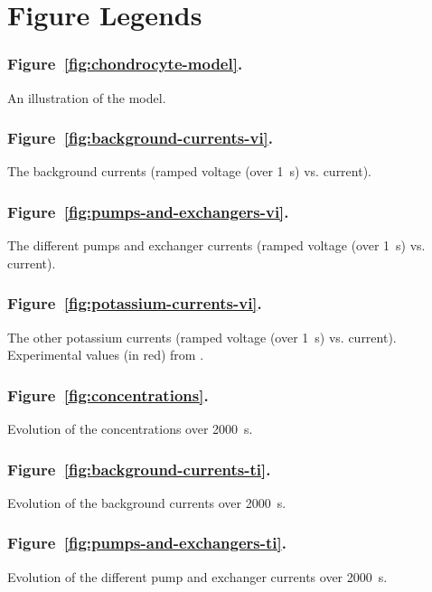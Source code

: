 \section*{Figure Legends}
\label{figures}

\subsubsection*{Figure~\ref{fig:chondrocyte-model}.}
An illustration of the model.

\subsubsection*{Figure~\ref{fig:background-currents-vi}.}
The background currents (ramped voltage (over 1~s) vs. current).

\subsubsection*{Figure~\ref{fig:pumps-and-exchangers-vi}.}
The different pumps and exchanger currents (ramped voltage (over 1~s) vs. current).

\subsubsection*{Figure~\ref{fig:potassium-currents-vi}.}
The other potassium currents (ramped voltage (over 1~s)
vs. current). Experimental values (in red) from \cite{Clarketal2011}.


\subsubsection*{Figure~\ref{fig:concentrations}.}
Evolution of the concentrations over 2000~s.

\subsubsection*{Figure~\ref{fig:background-currents-ti}.}
Evolution of the background currents over 2000~s.

\subsubsection*{Figure~\ref{fig:pumps-and-exchangers-ti}.}
Evolution of the different pump and exchanger currents over 2000~s.

